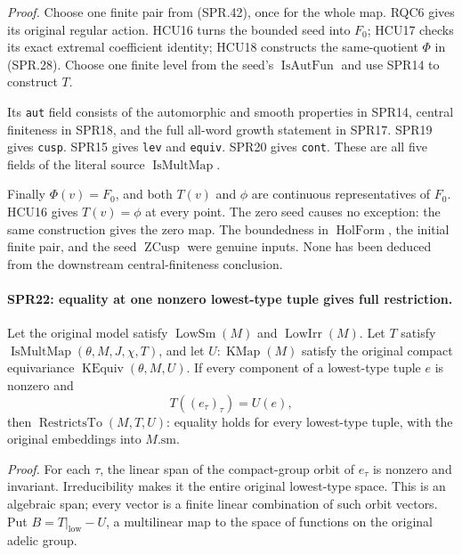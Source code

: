 \documentclass[11pt,a4paper]{article}
\numberwithin{equation}{section}
\theoremstyle{remark}\newtheorem{remark}[theorem]{Remark}
\begin{document}
\emph{Proof.}
Choose one finite pair from (SPR.42), once for the whole map.
RQC6 gives its original regular action.
HCU16 turns the bounded seed into \(F_0\);
HCU17 checks its exact extremal coefficient identity;
HCU18 constructs the same-quotient \(\Phi\) in (SPR.28).
Choose one finite level from the seed's
\(\operatorname{IsAutFun}\) and use SPR14 to construct \(T\).

Its \texttt{aut} field consists of the automorphic and smooth
properties in SPR14, central finiteness in SPR18, and the
full all-word growth statement in SPR17.
SPR19 gives \texttt{cusp}.
SPR15 gives \texttt{lev} and \texttt{equiv}.
SPR20 gives \texttt{cont}.
These are all five fields of the literal source
\(\operatorname{IsMultMap}\).

Finally \(\Phi(v)=F_0\), and both \(T(v)\) and \(\phi\) are
continuous representatives of \(F_0\).
HCU16 gives \(T(v)=\phi\) at every point.
The zero seed causes no exception: the same construction gives
the zero map.
The boundedness in \(\operatorname{HolForm}\), the initial
finite pair, and the seed \(\operatorname{ZCusp}\) were genuine
inputs.  None has been deduced from the downstream
central-finiteness conclusion.

\paragraph{SPR22: equality at one nonzero lowest-type tuple gives full restriction.}
\label{claim:SPR22}
Let the original model satisfy \(\operatorname{LowSm}(M)\) and
\(\operatorname{LowIrr}(M)\).  Let \(T\) satisfy
\(\operatorname{IsMultMap}(\theta,M,J,\chi,T)\), and let
\(U:\operatorname{KMap}(M)\) satisfy the original compact
equivariance \(\operatorname{KEquiv}(\theta,M,U)\).
If every component of a lowest-type tuple \(e\) is nonzero and
\[
       T((e_\tau)_\tau)=U(e),
 \tag{SPR.44}
\]
then \(\operatorname{RestrictsTo}(M,T,U)\): equality holds for
every lowest-type tuple, with the original embeddings into
\(M.\mathrm{sm}\).

\emph{Proof.}
For each \(\tau\), the linear span of the compact-group orbit of
\(e_\tau\) is nonzero and invariant.  Irreducibility makes it
the entire original lowest-type space.  This is an algebraic
span; every vector is a finite linear combination of such orbit
vectors.  Put \(B=T|_{\mathrm{low}}-U\), a multilinear map to
the space of functions on the original adelic group.
\end{document}
